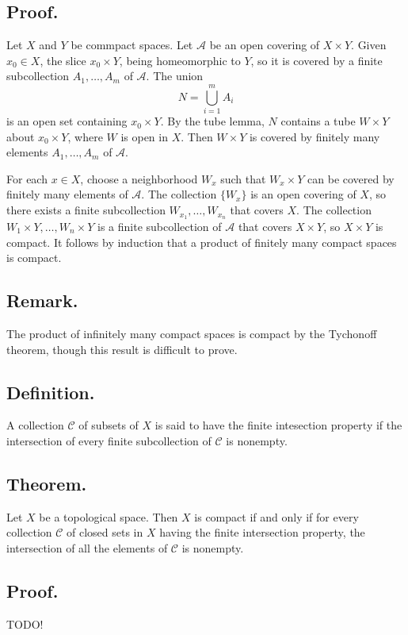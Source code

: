 \documentclass[titlepage]{article}
\begin{document}
\subsection{Proof.} Let $X$ and $Y$ be commpact spaces. Let $\mathcal{A}$ be an open covering of $X \times Y$. Given $x_{0} \in X$, the slice $x_{0} \times Y$, being homeomorphic to $Y$, so it is covered by a finite subcollection $A_{1}, \ldots, A_{m}$ of $\mathcal{A}$. The union 
$$N = \bigcup_{i=1}^{m} A_{i}$$
is an open set containing $x_{0} \times Y$. By the tube lemma, $N$ contains a tube $W \times Y$ about $x_{0} \times Y$, where $W$ is open in $X$. Then $W \times Y$ is covered by finitely many elements $A_{1}, \ldots, A_{m}$ of $\mathcal{A}$.

For each $x \in X$, choose a neighborhood $W_{x}$ such that $W_{x} \times Y$ can be covered by finitely many elements of $\mathcal{A}$. The collection $\{W_{x}\}$ is an open covering of $X$, so there exists a finite subcollection $W_{x_{1}}, \ldots, W_{x_{n}}$ that covers $X$. The collection $W_{1} \times Y, \ldots, W_{n} \times Y$ is a finite subcollection of $\mathcal{A}$ that covers $X \times Y$, so $X \times Y$ is compact. It follows by induction that a product of finitely many compact spaces is compact.

\subsection{Remark.} The product of infinitely many compact spaces is compact by the Tychonoff theorem, though this result is difficult to prove.

\subsection{Definition.} A collection $\mathcal{C}$ of subsets of $X$ is said to have the finite intesection property if the intersection of every finite subcollection of $\mathcal{C}$ is nonempty.

\subsection{Theorem.} Let $X$ be a topological space. Then $X$ is compact if and only if for every collection $\mathcal{C}$ of closed sets in $X$ having the finite intersection property, the intersection of all the elements of $\mathcal{C}$ is nonempty.

\subsection{Proof.} TODO!
\end{document}
